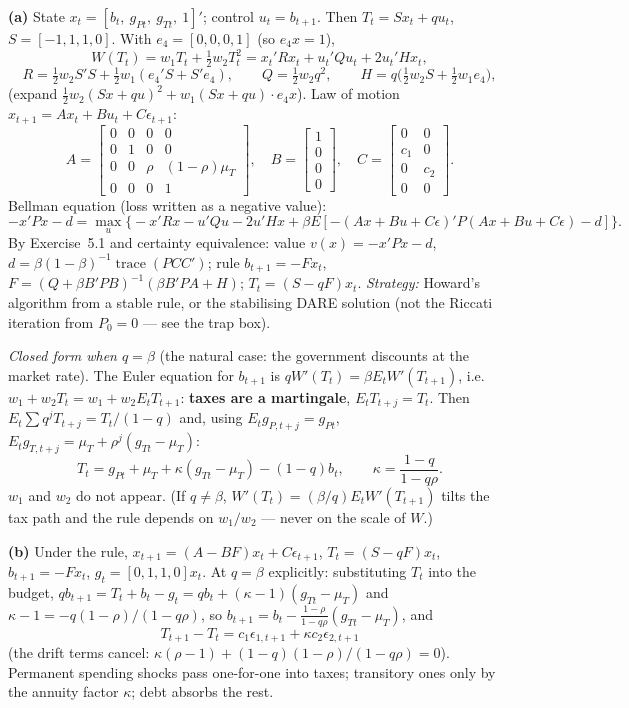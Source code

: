 \documentclass[12pt, letterpaper]{article}
\newcommand{\tr}{\operatorname{trace}}
\begin{document}
\begin{tcolorbox}[evenbox,title={Exercise 5.8 \quad Tax smoothing and a VAR for $[g_t,T_t]$}]
\textbf{(a)} State $x_t=[b_t,\ g_{Pt},\ g_{Tt},\ 1]'$; control $u_t=b_{t+1}$. Then
$T_t=Sx_t+qu_t$, $S=[-1,1,1,0]$. With $e_4=[0,0,0,1]$ (so $e_4x=1$),
\[
W(T_t)=w_1T_t+\tfrac12w_2T_t^2=x_t'Rx_t+u_t'Qu_t+2u_t'Hx_t,
\]
\[
R=\tfrac12w_2S'S+\tfrac12w_1(e_4'S+S'e_4),\qquad Q=\tfrac12w_2q^2,\qquad H=q\big(\tfrac12w_2S+\tfrac12w_1e_4\big),
\]
(expand $\tfrac12w_2(Sx+qu)^2+w_1(Sx+qu)\cdot e_4x$). Law of motion $x_{t+1}=Ax_t+Bu_t+C\epsilon_{t+1}$:
\[
A=\begin{bmatrix}0&0&0&0\\0&1&0&0\\0&0&\rho&(1-\rho)\mu_T\\0&0&0&1\end{bmatrix},\quad
B=\begin{bmatrix}1\\0\\0\\0\end{bmatrix},\quad
C=\begin{bmatrix}0&0\\c_1&0\\0&c_2\\0&0\end{bmatrix}.
\]
Bellman equation (loss written as a negative value):
\[
-x'Px-d=\max_u\big\{-x'Rx-u'Qu-2u'Hx+\beta E[-(Ax+Bu+C\epsilon)'P(Ax+Bu+C\epsilon)-d]\big\}.
\]
By Exercise~5.1 and certainty equivalence: value $v(x)=-x'Px-d$, $d=\beta(1-\beta)^{-1}\tr(PCC')$;
rule $b_{t+1}=-Fx_t$, $F=(Q+\beta B'PB)^{-1}(\beta B'PA+H)$; $T_t=(S-qF)x_t$. \emph{Strategy:}
Howard's algorithm from a stable rule, or the stabilising DARE solution (not the Riccati iteration
from $P_0=0$ --- see the trap box).

\emph{Closed form when $q=\beta$} (the natural case: the government discounts at the market rate).
The Euler equation for $b_{t+1}$ is $qW'(T_t)=\beta E_tW'(T_{t+1})$, i.e.\
$w_1+w_2T_t=w_1+w_2E_tT_{t+1}$: \textbf{taxes are a martingale}, $E_tT_{t+j}=T_t$. Then
$E_t\sum q^jT_{t+j}=T_t/(1-q)$ and, using
$E_tg_{P,t+j}=g_{Pt}$, $E_tg_{T,t+j}=\mu_T+\rho^j(g_{Tt}-\mu_T)$:
\[
\boxed{T_t=g_{Pt}+\mu_T+\kappa(g_{Tt}-\mu_T)-(1-q)b_t,\qquad \kappa=\frac{1-q}{1-q\rho}.}
\]
$w_1$ and $w_2$ do not appear. (If $q\ne\beta$, $W'(T_t)=(\beta/q)E_tW'(T_{t+1})$ tilts the tax
path and the rule depends on $w_1/w_2$ --- never on the scale of $W$.)

\textbf{(b)} Under the rule, $x_{t+1}=(A-BF)x_t+C\epsilon_{t+1}$, $T_t=(S-qF)x_t$, $b_{t+1}=-Fx_t$,
$g_t=[0,1,1,0]x_t$. At $q=\beta$ explicitly: substituting $T_t$ into the budget,
$qb_{t+1}=T_t+b_t-g_t=qb_t+(\kappa-1)(g_{Tt}-\mu_T)$ and $\kappa-1=-q(1-\rho)/(1-q\rho)$, so
$b_{t+1}=b_t-\frac{1-\rho}{1-q\rho}(g_{Tt}-\mu_T)$,
and
\[
T_{t+1}-T_t=c_1\epsilon_{1,t+1}+\kappa c_2\epsilon_{2,t+1}
\]
(the drift terms cancel: $\kappa(\rho-1)+(1-q)(1-\rho)/(1-q\rho)=0$). Permanent spending shocks pass
one-for-one into taxes; transitory ones only by the annuity factor $\kappa$; debt absorbs the rest.


\end{tcolorbox}
\end{document}
